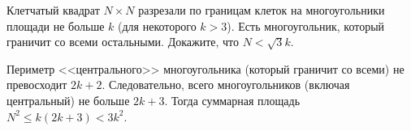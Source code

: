 Клетчатый квадрат $N \times N$ разрезали по границам клеток на многоугольники
площади не больше $k$ (для некоторого $k > 3$).
Есть многоугольник, который граничит со всеми остальными.
Докажите, что $N < \sqrt{3} k$.

\solution
Периметр <<центрального>> многоугольника (который граничит со всеми) не
превосходит $2 k + 2$.
Следовательно, всего многоугольников (включая центральный) не больше $2 k + 3$.
Тогда суммарная площадь $N^2 \leq k (2 k + 3) < 3 k^2$.

